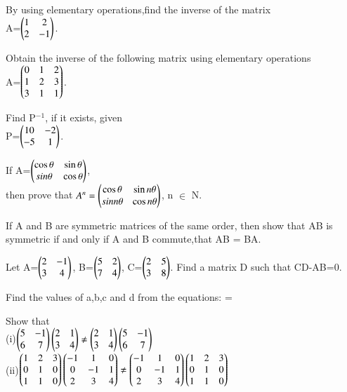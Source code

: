 \item By using elementary operations,find the inverse of the matrix\\
A=$\begin{pmatrix}1 &2\\2 &-1\end{pmatrix}$.\\
\item Obtain the inverse of the following matrix using elementary operations\\
A=$\begin{pmatrix}0 &1 &2\\1 &2 &3\\3 &1 &1\end{pmatrix}$.\\
\item Find P$^{-1}$, if it exists, given \\
P=$\begin{pmatrix}10 &-2\\-5 &1\end{pmatrix}$.\\
\item If A=$\begin{pmatrix}\cos\theta &\sin\theta\\ \-sin\theta &\cos\theta\end{pmatrix}$,\\then prove that $A^{n}=\begin{pmatrix}\cos\theta &\sin n\theta\\\-sin n\theta &\cos n\theta\end{pmatrix}$, n $\in$ N.\\
\item If A and B are symmetric matrices of the same order, then show that AB is symmetric if and only if A and B commute,that AB = BA.\\
\item Let A=$\begin{pmatrix}2 &-1\\3 &4\end{pmatrix}$, B=$\begin{pmatrix}5 &2\\7 &4\end{pmatrix}$, C=$\begin{pmatrix}2 &5\\3 &8\end{pmatrix}$. Find a matrix D such that CD-AB=0. 
\item Find the values of a,b,c and d from the equations:  = 
\item Show that\\
(i)$\begin{pmatrix}5 &-1\\6 &7\end{pmatrix}\begin{pmatrix}2 &1\\3 &4\end{pmatrix}\neq\begin{pmatrix}2 &1\\3 &4\end{pmatrix}\begin{pmatrix}5 &-1\\6 &7\end{pmatrix}$
\\
(ii)$\begin{pmatrix}1 &2 &3\\0 &1 &0\\1 &1 &0\end{pmatrix}\begin{pmatrix}-1 &1 &0\\0 &-1 &1\\2 &3 &4\end{pmatrix}\neq \begin{pmatrix}-1 &1 &0\\0 &-1 &1\\2 &3 &4\end{pmatrix}\begin{pmatrix}1 &2 &3\\0 &1 &0\\1 &1 &0\end{pmatrix}$\\
